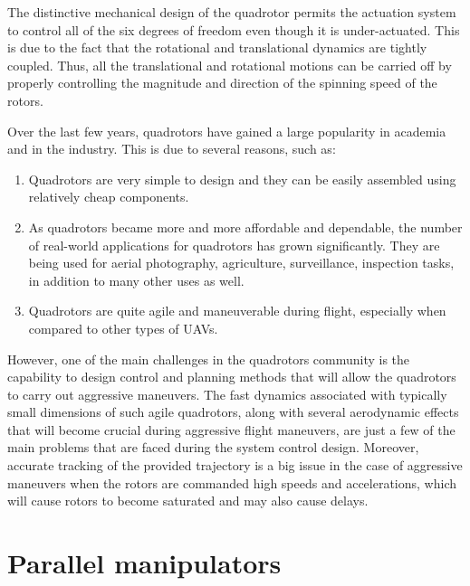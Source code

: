 \documentclass{thesisreport}
\begin{document}
\noindent The distinctive mechanical design of the quadrotor permits the actuation system to control all of the six degrees of freedom even though it is under-actuated. This is due to the fact that the rotational and translational dynamics are tightly coupled. Thus, all the translational and rotational motions can be carried off by properly controlling the magnitude and direction of the spinning speed of the rotors.   

\noindent {}


\pagebreak

Over the last few years, quadrotors have gained a large popularity in academia and in the industry. This is due to several reasons, such as: 

\begin{enumerate}

    \item Quadrotors are very simple to design and they can be easily assembled using relatively cheap components.  
    \item As quadrotors became more and more affordable and dependable, the number of real-world applications for quadrotors  has grown significantly. They are being used for aerial photography, agriculture, surveillance, inspection tasks, in addition to many other uses as well. 
    \item Quadrotors are quite agile and maneuverable during flight, especially when compared to other types of UAVs.
    
\end{enumerate}

However, one of the main challenges in the quadrotors community is the capability to design control and planning methods that will allow the quadrotors to carry out aggressive maneuvers.  The fast dynamics associated with typically small dimensions of such agile quadrotors, along with several aerodynamic effects that will become crucial during aggressive flight maneuvers, are just a few of the main problems that are faced during the system control design. Moreover, accurate tracking of the provided trajectory is a big issue in the case of aggressive maneuvers when the rotors are commanded high speeds and accelerations, which will cause rotors to become saturated and may also cause delays.


 \section*{Parallel manipulators}
\end{document}
